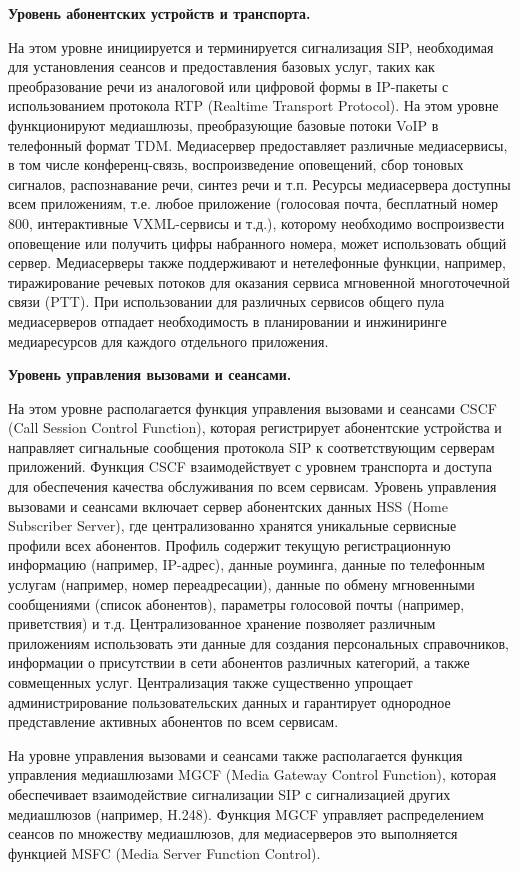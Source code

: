 \textbf{Уровень абонентских устройств и транспорта.}

На этом уровне инициируется и терминируется сигнализация SIP, необходимая для установления сеансов и предоставления базовых услуг, таких как преобразование речи из аналоговой или цифровой формы в IP-пакеты с использованием протокола RTP (Realtime Transport Protocol). На этом уровне функционируют медиашлюзы, преобразующие базовые потоки VoIP в телефонный формат TDM. Медиасервер предоставляет различные медиасервисы, в том числе конференц-связь, воспроизведение оповещений, сбор тоновых сигналов, распознавание речи, синтез речи и т.п. Ресурсы медиасервера доступны всем приложениям, т.е. любое приложение (голосовая почта, бесплатный номер 800, интерактивные VXML-сервисы и т.д.), которому необходимо воспроизвести оповещение или получить цифры набранного номера, может использовать общий сервер. Медиасерверы также поддерживают и нетелефонные функции, например, тиражирование речевых потоков для оказания сервиса мгновенной многоточечной связи (PTT). При использовании для различных сервисов общего пула медиасерверов отпадает необходимость в планировании и инжиниринге медиаресурсов для каждого отдельного приложения.


\textbf{Уровень управления вызовами и сеансами.}

На этом уровне располагается функция управления вызовами и сеансами CSCF (Call Session Control Function), которая регистрирует абонентские устройства и направляет сигнальные сообщения протокола SIP к соответствующим серверам приложений. Функция CSCF взаимодействует с уровнем транспорта и доступа для обеспечения качества обслуживания по всем сервисам. Уровень управления вызовами и сеансами включает сервер абонентских данных HSS (Home Subscriber Server), где централизованно хранятся уникальные сервисные профили всех абонентов. Профиль содержит текущую регистрационную информацию (например, IP-адрес), данные роуминга, данные по телефонным услугам (например, номер переадресации), данные по обмену мгновенными сообщениями (список абонентов), параметры голосовой почты (например, приветствия) и т.д. Централизованное хранение позволяет различным приложениям использовать эти данные для создания персональных справочников, информации о присутствии в сети абонентов различных категорий, а также совмещенных услуг. Централизация также существенно упрощает администрирование пользовательских данных и гарантирует однородное представление активных абонентов по всем сервисам.

На уровне управления вызовами и сеансами также располагается функция управления медиашлюзами MGCF (Media Gateway Control Function), которая обеспечивает взаимодействие сигнализации SIP с сигнализацией других медиашлюзов (например, H.248). Функция MGCF управляет распределением сеансов по множеству медиашлюзов, для медиасерверов это выполняется функцией MSFC (Media Server Function Control).

